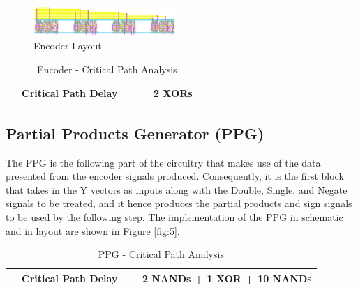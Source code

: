 \documentclass[journal]{IEEEtran}
\begin{document}
\begin{figure}[h!]
  \centering
  \includegraphics[width=0.48\textwidth]{4.png}
  \centering
  \caption{Encoder Layout}
  \label{fig:4}
\end{figure}



\begin{table}[!h]
\renewcommand{\arraystretch}{1.5}
\caption{Encoder - Critical Path Analysis}
\label{tab:t2}
\centering
\begin{tabular}{|c|c|}
\hline
~~Critical Path Delay ~~ & ~~2 XORs~~\\
\hline
\end{tabular}
\end{table}


\vspace{-10pt}

\subsection{Partial Products Generator (PPG)}

The PPG is the following part of the circuitry that makes use of the data presented from the encoder signals produced. Consequently, it is the first block that takes in the Y vectors as inputs along with the Double, Single, and Negate signals to be treated, and it hence produces the partial products and sign signals to be used by the following step. The implementation of the PPG in schematic and in layout are shown in Figure \ref{fig:5}.

\begin{table}[!h]
\renewcommand{\arraystretch}{1.5}
\caption{PPG - Critical Path Analysis}
\label{tab:t3}
\centering
\begin{tabular}{|c|c|}
\hline
~~Critical Path Delay ~~ & 2 NANDs + 1 XOR + 10 NANDs\\
\hline
\end{tabular}
\end{table}
\end{document}
